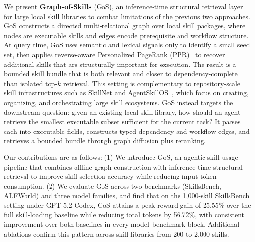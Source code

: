 
We present \textbf{Graph-of-Skills} (GoS), an inference-time structural retrieval layer for large local skill libraries to combat limitations of the previous two approaches. GoS constructs a directed multi-relational graph over local skill packages, where nodes are executable skills and edges encode prerequisite and workflow structure. At query time, GoS uses semantic and lexical signals only to identify a small seed set, then applies reverse-aware Personalized PageRank (PPR)~\citep{10.1145/511446.511513, 10471277} to recover additional skills that are structurally important for execution. The result is a bounded skill bundle that is both relevant and closer to dependency-complete than isolated top-$k$ retrieval.
%
This setting is complementary to repository-scale skill infrastructures such as SkillNet and AgentSkillOS~\citep{skillnet2026, li2026agentskillos}, which focus on creating, organizing, and orchestrating large skill ecosystems. GoS instead targets the downstream question: given an existing local skill library, how should an agent retrieve the smallest executable subset sufficient for the current task? It parses each \skillfile into executable fields, constructs typed dependency and workflow edges, and retrieves a bounded bundle through graph diffusion plus reranking.

Our contributions are as follows:
    (1) We introduce GoS, an agentic skill usage pipeline that combines offline graph construction with inference-time structural retrieval to improve skill selection accuracy while reducing input token consumption.
    (2) We evaluate GoS across two benchmarks (SkillsBench, ALFWorld) and three model families, and find that on the 1{,}000-skill SkillsBench setting under GPT-5.2 Codex, GoS attains a peak reward gain of 25.55\% over the full skill-loading baseline while reducing total tokens by 56.72\%, with consistent improvement over both baselines in every model--benchmark block. Additional ablations confirm this pattern across skill libraries from 200 to 2{,}000 skills.